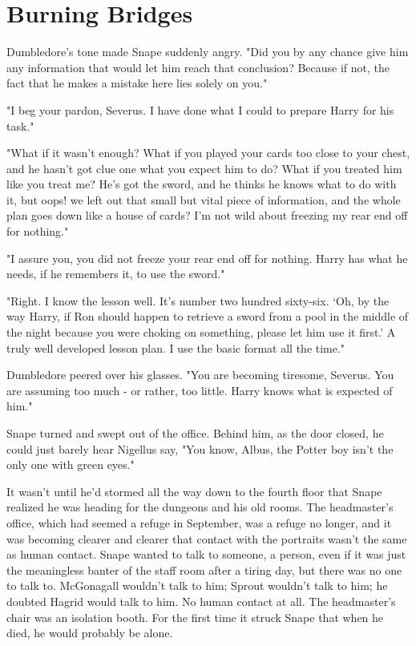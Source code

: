 
\chapter{Burning Bridges}

Dumbledore's tone made Snape suddenly angry. "Did you by any chance give him any information that would let him reach that conclusion? Because if not, the fact that he makes a mistake here lies solely on you."

"I beg your pardon, Severus. I have done what I could to prepare Harry for his task."

"What if it wasn't enough? What if you played your cards too close to your chest, and he hasn't got clue one what you expect him to do? What if you treated him like you treat me? He's got the sword, and he thinks he knows what to do with it, but oops! we left out that small but vital piece of information, and the whole plan goes down like a house of cards? I'm not wild about freezing my rear end off for nothing."

"I assure you, you did not freeze your rear end off for nothing. Harry has what he needs, if he remembers it, to use the sword."

"Right. I know the lesson well. It's number two hundred sixty-six. `Oh, by the way Harry, if Ron should happen to retrieve a sword from a pool in the middle of the night because you were choking on something, please let him use it first.' A truly well developed lesson plan. I use the basic format all the time."

Dumbledore peered over his glasses. "You are becoming tiresome, Severus. You are assuming too much - or rather, too little. Harry knows what is expected of him."

Snape turned and swept out of the office. Behind him, as the door closed, he could just barely hear Nigellus say, "You know, Albus, the Potter boy isn't the only one with green eyes."

It wasn't until he'd stormed all the way down to the fourth floor that Snape realized he was heading for the dungeons and his old rooms. The headmaster's office, which had seemed a refuge in September, was a refuge no longer, and it was becoming clearer and clearer that contact with the portraits wasn't the same as human contact. Snape wanted to talk to someone, a person, even if it was just the meaningless banter of the staff room after a tiring day, but there was no one to talk to. McGonagall wouldn't talk to him; Sprout wouldn't talk to him; he doubted Hagrid would talk to him. No human contact at all. The headmaster's chair was an isolation booth. For the first time it struck Snape that when he died, he would probably be alone.


